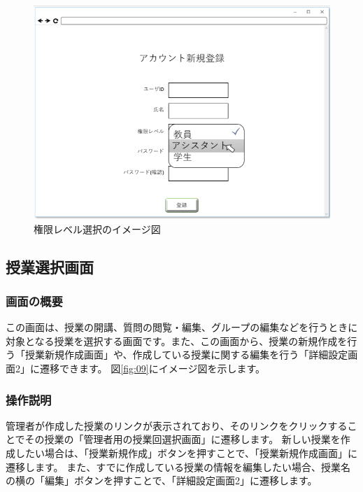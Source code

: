 \begin{figure}[phtbp]
  \begin{center}
    \includegraphics[width=1\linewidth,clip]{./img/08.png}
    \caption{権限レベル選択のイメージ図}\label{fig:08}
  \end{center}
\end{figure}

\newpage

\subsection{授業選択画面}
\subsubsection{画面の概要}
この画面は、授業の開講、質問の閲覧・編集、グループの編集などを行うときに対象となる授業を選択する画面です。また、この画面から、授業の新規作成を行う「授業新規作成画面」や、作成している授業に関する編集を行う「詳細設定画面2」に遷移できます。
図\ref{fig:09}にイメージ図を示します。

\subsubsection{操作説明}
管理者が作成した授業のリンクが表示されており、そのリンクをクリックすることでその授業の「管理者用の授業回選択画面」に遷移します。
新しい授業を作成したい場合は、「授業新規作成」ボタンを押すことで、「授業新規作成画面」に遷移します。
また、すでに作成している授業の情報を編集したい場合、授業名の横の「編集」ボタンを押すことで、「詳細設定画面2」に遷移します。

